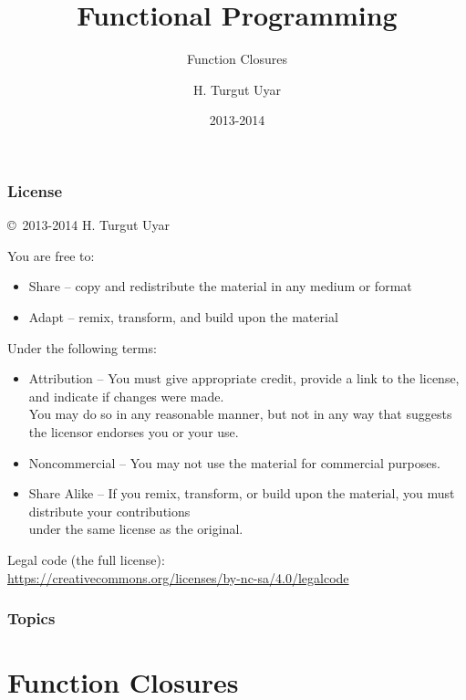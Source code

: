 \documentclass[dvipsnames]{beamer}
\title{Functional Programming}
\subtitle{Function Closures}
\author{H. Turgut Uyar}
\date{2013-2014}
\theoremstyle{plain}
\begin{document}

\begin{frame}
  \titlepage
\end{frame}

\begin{frame}
  \frametitle{License}

  \hfill
  \copyright~2013-2014 H. Turgut Uyar

  \vfill
  \begin{tiny}
    You are free to:
    \begin{itemize}
      \item Share -- copy and redistribute the material in any medium or format
      \item Adapt -- remix, transform, and build upon the material
    \end{itemize}

    Under the following terms:
    \begin{itemize}
      \item Attribution -- You must give appropriate credit, provide a link to
        the license, and indicate if changes were made.\\
        You may do so in any reasonable manner, but not in any way
        that suggests the licensor endorses you or your use.

      \item Noncommercial -- You may not use the material for commercial
        purposes.

      \item Share Alike -- If you remix, transform, or build upon the material,
        you must distribute your contributions\\
        under the same license as the original.
    \end{itemize}
  \end{tiny}

  \vfill
  \begin{small}
    Legal code (the full license):\\
    \url{https://creativecommons.org/licenses/by-nc-sa/4.0/legalcode}
  \end{small}
\end{frame}

\begin{frame}
  \frametitle{Topics}
  \tableofcontents
\end{frame}

\section{Function Closures}
\end{document}
